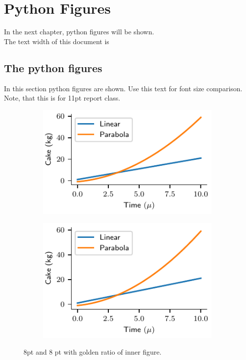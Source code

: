 \documentclass[a4paper,11pt]{report}
\begin{document}
	
\chapter{Python Figures}

In the next chapter, python figures will be shown. \\
The text width of this document is \printlength{\textwidth}

\section{The python figures}

In this section python figures are shown. Use this text for font size comparison. Note, that this is for 11pt report class. 

\begin{figure}
	\centering
	\begin{subfigure}{0.49\textwidth}
		\centering
		\includegraphics[width=1\linewidth]{fig/TwoGolden.pdf}
		\caption{}
	\end{subfigure}
	\begin{subfigure}{0.49\textwidth}
		\centering
		\includegraphics[width=1\linewidth]{fig/TwoInnerGolden.pdf}
		\caption{}
	\end{subfigure}
	\caption{8pt and $8$ pt with golden ratio of inner figure.}
\end{figure}
\end{document}
